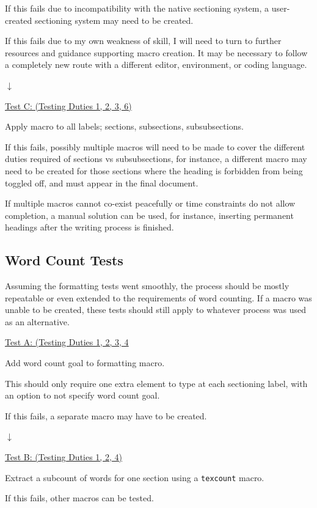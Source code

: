 \documentclass[12pt]{article}
\begin{document}
If this fails due to incompatibility with the native sectioning system, a user-created sectioning system may need to be created.

If this fails due to my own weakness of skill, I will need to turn to further resources and guidance supporting macro creation. It may be necessary to follow a completely new route with a different editor, environment, or coding language.

$\downarrow$

\underline{Test C: (Testing Duties 1, 2, 3, 6)}

Apply macro to all labels; sections, subsections, subsubsections.

If this fails, possibly multiple macros will need to be made to cover the different duties required of sections vs subsubsections, for instance, a different macro may need to be created for those sections where the heading is forbidden from being toggled off, and must appear in the final document.

If multiple macros cannot co-exist peacefully or time constraints do not allow completion, a manual solution can be used, for instance, inserting permanent headings after the writing process is finished.

\vspace{2em}
\subsection*{Word Count Tests}

Assuming the formatting tests went smoothly, the process should be mostly repeatable or even extended to the requirements of word counting. If a macro was unable to be created, these tests should still apply to whatever process was used as an alternative.

\underline{Test A: (Testing Duties 1, 2, 3, 4}

Add word count goal to formatting macro.

This should only require one extra element to type at each sectioning label, with an option to not specify word count goal.

If this fails, a separate macro may have to be created.

$\downarrow$

\underline{Test B: (Testing Duties 1, 2, 4)}

Extract a subcount of words for one section using a \texttt{texcount} macro.

If this fails, other macros can be tested.
\end{document}
